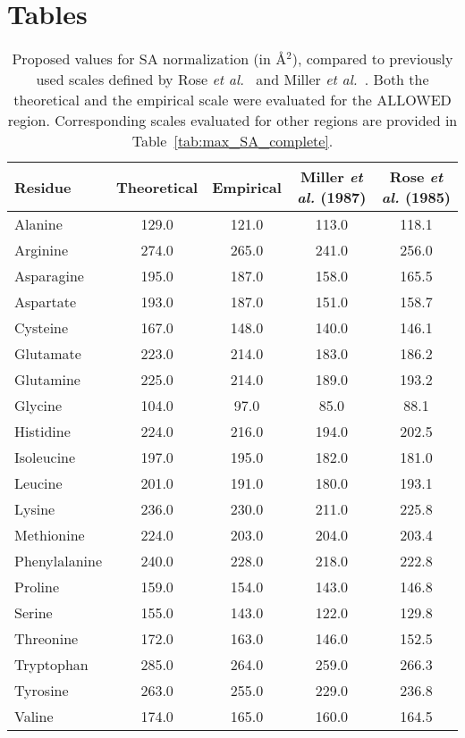 \documentclass[11pt]{article}
\begin{document}
\cleardoublepage

\section*{Tables}

\begin{table}[H]
\caption{\label{tab:results}Proposed values for SA normalization (in \AA$^2$), compared to previously used scales defined by Rose \emph{et al.}~\cite{Rose1985} and Miller \emph{et al.}~\cite{Miller1987}. Both the theoretical and the empirical scale were evaluated for the ALLOWED region. Corresponding scales evaluated for other regions are provided in Table~\ref{tab:max_SA_complete}.}

\begin{center}
\begin{tabular}{lcccc}
Residue & Theoretical & Empirical & Miller \emph{et al.} (1987) & Rose \emph{et al.} (1985) \\
\hline Alanine & 129.0 & 121.0 & 113.0 & 118.1 \\
Arginine        & 274.0 & 265.0 & 241.0 & 256.0 \\
Asparagine    & 195.0 & 187.0 & 158.0 & 165.5 \\
Aspartate      & 193.0 & 187.0 & 151.0 & 158.7 \\
Cysteine        & 167.0 & 148.0 & 140.0 & 146.1 \\
Glutamate     & 223.0 & 214.0 & 183.0 & 186.2 \\
Glutamine      & 225.0 & 214.0 & 189.0 & 193.2  \\
Glycine          & 104.0 & 97.0 & 85.0 & 88.1  \\
Histidine        & 224.0 & 216.0 & 194.0 & 202.5  \\
Isoleucine     & 197.0 & 195.0 & 182.0 & 181.0  \\
Leucine         & 201.0 & 191.0 & 180.0 & 193.1  \\
Lysine           & 236.0 & 230.0 & 211.0 & 225.8  \\
Methionine   & 224.0 & 203.0 & 204.0 & 203.4  \\
Phenylalanine  & 240.0 & 228.0 & 218.0 & 222.8  \\
Proline & 159.0 & 154.0& 143.0 & 146.8  \\
Serine          & 155.0 & 143.0 & 122.0 & 129.8  \\
Threonine          & 172.0 & 163.0 & 146.0 & 152.5  \\
Tryptophan          & 285.0 & 264.0 & 259.0 & 266.3  \\
Tyrosine          & 263.0 & 255.0 & 229.0 & 236.8 \\
Valine          & 174.0 & 165.0 & 160.0 & 164.5  \\
\hline
\end{tabular}
\end{center}
\end{table}
\end{document}
